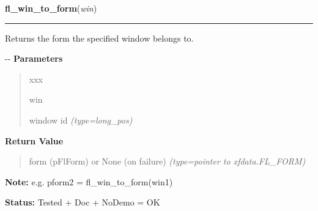 \hspace{.8\funcindent}\begin{boxedminipage}{\funcwidth}

    \raggedright \textbf{fl\_win\_to\_form}(\textit{win})

    \vspace{-1.5ex}

    \rule{\textwidth}{0.5\fboxrule}
\setlength{\parskip}{2ex}

Returns the form the specified window belongs to.

-{}-
\setlength{\parskip}{1ex}
      \textbf{Parameters}
      \vspace{-1ex}

      \begin{quote}
        \begin{Ventry}{xxx}

          \item[win]


window id
            {\it (type=long\_pos)}

        \end{Ventry}

      \end{quote}

      \textbf{Return Value}
    \vspace{-1ex}

      \begin{quote}

form (pFlForm) or None (on failure)
      {\it (type=pointer to xfdata.FL\_FORM)}

      \end{quote}

\textbf{Note:} 
e.g. pform2 = fl\_win\_to\_form(win1)


\textbf{Status:} 
Tested + Doc + NoDemo = OK


    \end{boxedminipage}

    \label{xformslib:flxbasic:fl_set_form_icon}

    \vspace{0.5ex}

